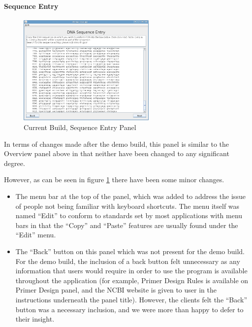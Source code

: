 \paragraph{Sequence Entry}

\begin{figure}[!t]
  \begin{center}
    \includegraphics[width=0.6\textwidth]{./images/currentBuild/sequenceEntry.png}
    \caption{
      \label{fig:currentBuild:sequenceEntry}
      Current Build, Sequence Entry Panel
    }
  \end{center}
\end{figure}

In terms of changes made after the demo build, this panel is similar
to the Overview panel above in that neither have been changed to any
significant degree.

However, as can be seen in figure \ref{fig:currentBuild:sequenceEntry}
there have been some minor changes.

\begin{itemize}
\item The menu bar at the top of the panel, which was added to
address the issue of people not being familiar with keyboard
shortcuts.
The menu itself was named ``Edit'' to conform to standards set by most
applications with menu bars in that the ``Copy'' and ``Paste''
features are usually found under the ``Edit'' menu.

\item The ``Back'' button on this panel which was not present for
the demo build.
For the demo build, the inclusion of a back button felt unnecessary as
any information that users would require in order to use the 
program is available throughout the application (for example, Primer Design 
Rules is available on Primer Design panel, and the NCBI website \cite{ncbi}
is given to user in the instructions underneath the panel title).
However, the clients felt the ``Back'' button was a necessary inclusion, and
we were more than happy to defer to their insight.
\end{itemize}

